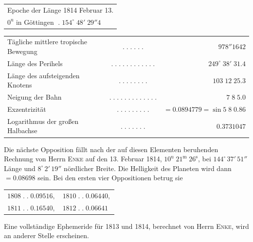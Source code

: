 \medskip
\begin{center}\fontsize{10}{12}\selectfont\setlength{\tabcolsep}{2pt}\renewcommand{\arraystretch}{1.15}\begin{tabular}{l}
Epoche der Länge 1814 Februar 13.\\$0^{\mathrm u}$ in Göttingen $\; .\; 154^\circ\;48'\;29''4$
\end{tabular}\end{center}
\begin{center}\fontsize{9}{11}\selectfont\setlength{\tabcolsep}{2pt}\renewcommand{\arraystretch}{1.15}\begin{tabular}{lcr}
Tägliche mittlere tropische Bewegung & $.\;.\;.\;.\;.\;.$ & $978''1642$\\
Länge des Perihels & $.\;.\;.\;.\;.\;.\;.\;.\;.\;.\;.\;.$ & $249^\circ\;38'\;31.4$\\
Länge des aufsteigenden Knotens & $.\;.\;.\;.\;.\;.\;.\;.$ & $103\;12\;25.3$\\
Neigung der Bahn & $.\;.\;.\;.\;.\;.\;.\;.\;.\;.\;.\;.\;.$ & $7\;8\;5.0$\\
Exzentrizität & $.\;.\;.\;.\;.\;.\;.\;.\;.$ & $=0.0894779=\sin 5\;8\;0.86$\\
Logarithmus der großen Halbachse & $.\;.\;.\;.\;.\;.\;.$ & $0.3731047$\\
\end{tabular}\end{center}

\par\indent Die nächste Opposition fällt nach der auf diesen Elementen beruhenden Rechnung von Herrn \textsc{Enke} auf den 13. Februar 1814, $10^{\mathrm u}\;21^{\mathrm m}\;26^{\mathrm s}$, bei $144^\circ\,37'\,51''$ Länge und $8^\circ\,2'\,19''$ nördlicher Breite. Die Helligkeit des Planeten wird dann $= 0.08698$ sein. Bei den ersten vier Oppositionen betrug sie

\medskip
\begin{center}\begin{tabular}{ll}$1808\;.\;.\;0.09516,$ & $1810\;.\;.\;0.06440,$\\$1811\;.\;.\;0.16540,$ & $1812\;.\;.\;0.06641$\end{tabular}\end{center}

\medskip
\noindent Eine vollständige Ephemeride für 1813 und 1814, berechnet von Herrn \textsc{Enke}, wird an anderer Stelle erscheinen.

